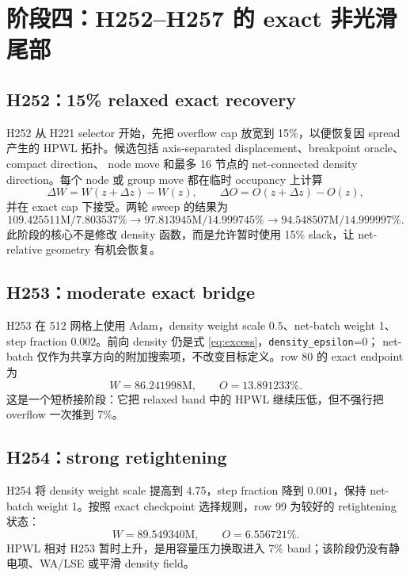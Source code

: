 \documentclass[UTF8,a4paper,11pt]{ctexrep}
\begin{document}
\chapter{阶段四：H252--H257 的 exact 非光滑尾部}

\section{H252：15\% relaxed exact recovery}
H252 从 H221 selector 开始，先把 overflow cap 放宽到 15\%，以便恢复因 spread 产生的
HPWL 拓扑。候选包括 axis-separated displacement、breakpoint oracle、compact direction、
node move 和最多 16 节点的 net-connected density direction。每个 node 或 group move
都在临时 occupancy 上计算
\[
 \Delta W=W(z+\Delta z)-W(z),\qquad
 \Delta O=O(z+\Delta z)-O(z),
\]
并在 exact cap 下接受。两轮 sweep 的结果为
\[
 109.425511\text{M}/7.803537\%
 \rightarrow97.813945\text{M}/14.999745\%
 \rightarrow94.548507\text{M}/14.999997\%.
\]
此阶段的核心不是修改 density 函数，而是允许暂时使用 15\% slack，让 net-relative
geometry 有机会恢复。

\section{H253：moderate exact bridge}
H253 在 512 网格上使用 Adam，density weight scale $0.5$、net-batch weight 1、
step fraction $0.002$。前向 density 仍是式 \eqref{eq:excess}，\texttt{density\_epsilon}=0；
net-batch 仅作为共享方向的附加搜索项，不改变目标定义。row 80 的 exact endpoint 为
\[
  W=86.241998\text{M},\qquad O=13.891233\%.
\]
这是一个短桥接阶段：它把 relaxed band 中的 HPWL 继续压低，但不强行把 overflow
一次推到 7\%。

\section{H254：strong retightening}
H254 将 density weight scale 提高到 4.75，step fraction 降到 $0.001$，保持 net-batch
weight 1。按照 exact checkpoint 选择规则，row 99 为较好的 retightening 状态：
\[
  W=89.549340\text{M},\qquad O=6.556721\%.
\]
HPWL 相对 H253 暂时上升，是用容量压力换取进入 7\% band；该阶段仍没有静电项、WA/LSE
或平滑 density field。
\end{document}
